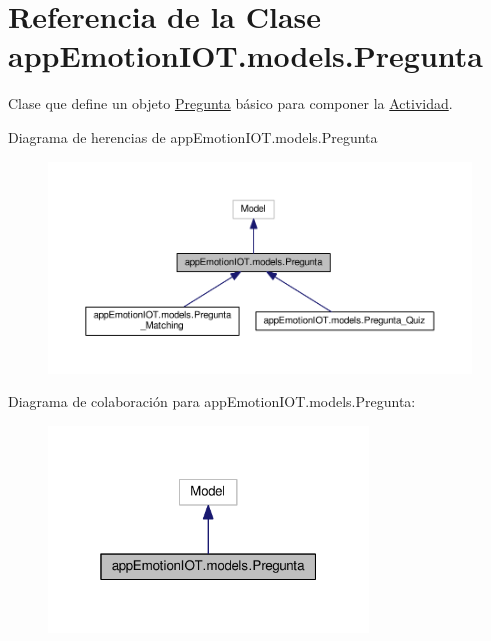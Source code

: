 \hypertarget{classappEmotionIOT_1_1models_1_1Pregunta}{}\section{Referencia de la Clase app\+Emotion\+I\+O\+T.\+models.\+Pregunta}
\label{classappEmotionIOT_1_1models_1_1Pregunta}


Clase que define un objeto \hyperlink{classappEmotionIOT_1_1models_1_1Pregunta}{Pregunta} básico para componer la \hyperlink{classappEmotionIOT_1_1models_1_1Actividad}{Actividad}.  




Diagrama de herencias de app\+Emotion\+I\+O\+T.\+models.\+Pregunta
\nopagebreak
\begin{figure}[H]
\begin{center}
\leavevmode
\includegraphics[width=350pt]{classappEmotionIOT_1_1models_1_1Pregunta__inherit__graph}
\end{center}
\end{figure}


Diagrama de colaboración para app\+Emotion\+I\+O\+T.\+models.\+Pregunta\+:
\nopagebreak
\begin{figure}[H]
\begin{center}
\leavevmode
\includegraphics[width=241pt]{classappEmotionIOT_1_1models_1_1Pregunta__coll__graph}
\end{center}
\end{figure}
